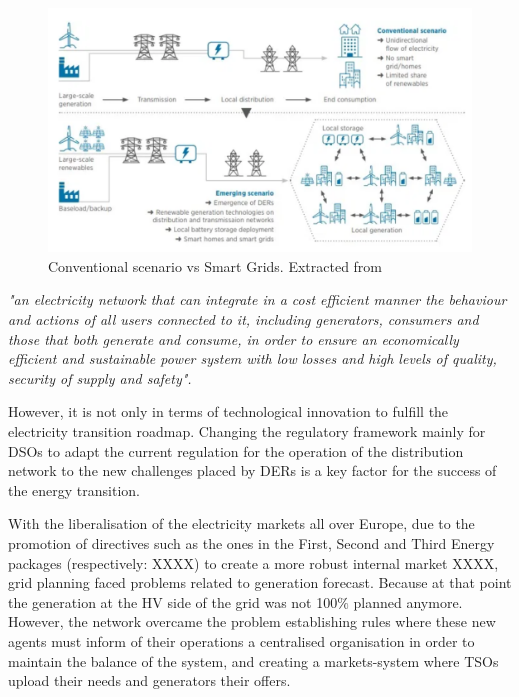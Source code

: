\begin{figure}[h]
	\centering 
	\includegraphics[width=0.9\columnwidth ]{ChapterIntro/Figures/Irena-DSO-1.png}
		\caption{Conventional scenario vs Smart Grids. Extracted from \cite{IRENA2018}}  
		\label{fig:IRENA-DSO}
\end{figure}




\begin{tcolorbox}
\textit{"an electricity network that can integrate in a cost efficient manner the behaviour and actions of all users connected to it, including generators, consumers and those that both generate and consume, in order to ensure an economically efficient and sustainable power system with low losses and high levels of quality, security of supply and safety".} 
\end{tcolorbox}

However, it is not only in terms of technological innovation to fulfill the electricity transition roadmap. Changing the regulatory framework mainly for DSOs to adapt the current regulation for the operation of the distribution network to the new challenges placed by DERs is a key factor for the success of the energy transition.

With the liberalisation of the electricity markets all over Europe, due to the promotion of directives such as the ones in the First, Second and Third Energy packages (respectively: XXXX) to create a more robust internal market XXXX, grid planning faced problems related to generation forecast. Because at that point the generation at the HV side of the grid was not 100$\%$ planned anymore. However, the network overcame the problem establishing rules where these new agents must inform of their operations a centralised organisation in order to maintain the balance of the system, and creating a markets-system where TSOs upload their needs and generators their offers. 

